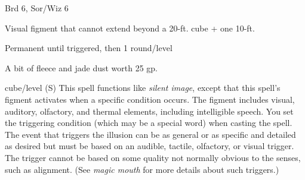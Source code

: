 
\begin{description*}
\item[Level:] Brd 6, Sor/Wiz 6
\item[Effect:] Visual figment that cannot extend beyond a 20-ft. cube + one 10-ft.
\item[Duration:] Permanent until triggered, then 1 round/level
\item[Arcane Material Component:] A bit of fleece and jade dust worth 25 gp.
\end{description*}

cube/level (S)
This spell functions like \textit{silent image}, except that this spell's figment
activates when a specific condition occurs. The figment includes visual, auditory,
olfactory, and thermal elements, including intelligible speech.
You set the triggering condition (which may be a special word) when casting the
spell. The event that triggers the illusion can be as general or as specific and
detailed as desired but must be based on an audible, tactile, olfactory, or visual
trigger. The trigger cannot be based on some quality not normally obvious to the
senses, such as alignment. (See \textit{magic mouth} for more details about such
triggers.)